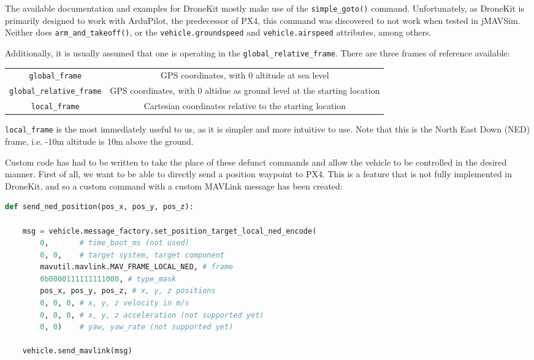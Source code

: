\documentclass[11pt]{article}
\begin{document}
\label{control_implementation}
The available documentation and examples for DroneKit mostly make use of the \lstinline|simple_goto()| command.\cite{PX4_dev_guide}\cite{dronekit} Unfortunately, as DroneKit is primarily designed to work with ArduPilot, the predecessor of PX4, this command was discovered to not work when tested in jMAVSim. Neither does \lstinline|arm_and_takeoff()|, or the \lstinline|vehicle.groundspeed| and \lstinline|vehicle.airspeed| attributes, among others.

Additionally, it is usually assumed that one is operating in the \lstinline|global_relative_frame|. There are three frames of reference available:
\begin{center}
\begin{tabular}{cc}
    \lstinline|global_frame| & GPS coordinates, with 0 altitude at sea level \\
    \lstinline|global_relative_frame| & GPS coordinates, with 0 altidue as ground level at the starting location \\
    \lstinline|local_frame| & Cartesian coordinates relative to the starting location
\end{tabular}
\end{center}
\lstinline|local_frame| is the most immediately useful to us, as it is simpler and more intuitive to use. Note that this is the North East Down (NED) frame, i.e. -10m altitude is 10m above the ground.

Custom code has had to be written to take the place of these defunct commands and allow the vehicle to be controlled in the desired manner. First of all, we want to be able to directly send a position waypoint to PX4. This is a feature that is not fully implemented in DroneKit, and so a custom command with a custom MAVLink message has been created:
\begin{lstlisting}[language=Python]
def send_ned_position(pos_x, pos_y, pos_z):

    msg = vehicle.message_factory.set_position_target_local_ned_encode(
        0,       # time_boot_ms (not used)
        0, 0,    # target system, target component
        mavutil.mavlink.MAV_FRAME_LOCAL_NED, # frame
        0b0000111111111000, # type_mask
        pos_x, pos_y, pos_z, # x, y, z positions
        0, 0, 0, # x, y, z velocity in m/s
        0, 0, 0, # x, y, z acceleration (not supported yet)
        0, 0)    # yaw, yaw_rate (not supported yet)

    vehicle.send_mavlink(msg)
\end{lstlisting}
\end{document}
